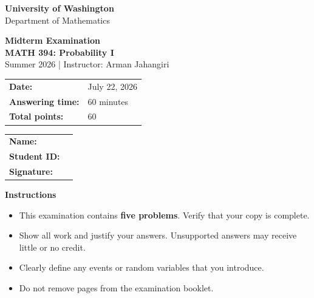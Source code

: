 \documentclass[11pt]{article}
\newcommand{\course}{MATH 394: Probability I}
\newcommand{\instructor}{Arman Jahangiri}
\newcommand{\department}{Department of Mathematics}
\newcommand{\university}{University of Washington}
\begin{document}
\begin{titlepage}
\centering
\vspace*{0.05cm}

{\Large \textbf{\university}}\\
{\large \department}

\vspace{0.28cm}

{\LARGE \color{uwpurple}\textbf{Midterm Examination}}\\[0.15cm]
{\Large \textbf{\course}}\\[0.15cm]
{\large Summer 2026 \quad | \quad Instructor: \instructor}

\vspace{0.22cm}

\begin{tcolorbox}[
    width=0.94\textwidth,
    colback=softpurple,
    colframe=uwpurple,
    boxrule=0.9pt,
    arc=3mm
]
\centering
\renewcommand{\arraystretch}{1.15}
\begin{tabular}{>{\bfseries}p{}p{}}
Date: & July 22, 2026 \\
Answering time: & 60 minutes \\
Total points: & 60 \\
\end{tabular}
\end{tcolorbox}

\vspace{0.18cm}

\begin{tcolorbox}[
    width=0.94\textwidth,
    colback=white,
    colframe=uwgold,
    boxrule=0.8pt,
    arc=3mm
]
\renewcommand{\arraystretch}{1.35}
\begin{tabular}{>{\bfseries}p{}p{}}
Name: & \hrulefill \\
Student ID: & \hrulefill \\
Signature: & \hrulefill \\
\end{tabular}
\end{tcolorbox}

\vspace{0.15cm}

\begin{policybox}
\small
\textbf{Instructions}
\begin{itemize}[leftmargin=*,itemsep=0.05em,topsep=0.15em,parsep=0pt]
    \item This examination contains \textbf{five problems}. Verify that your copy is complete.
    \item Show all work and justify your answers. Unsupported answers may receive little or no credit.
    \item Clearly define any events or random variables that you introduce.    
    \item Do not remove pages from the examination booklet.
\end{itemize}


\end{policybox}
\end{titlepage}
\end{document}
